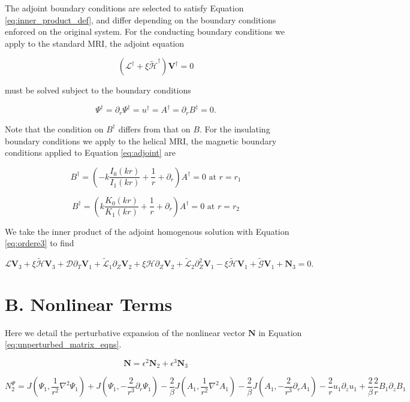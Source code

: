 \documentclass{emulateapj}
\newcommand{\beq}{\begin{equation}}
\newcommand{\eeq}{\end{equation}}
\begin{document}
The adjoint boundary conditions are selected to satisfy Equation \ref{eq:inner_product_def}, and differ depending on the boundary conditions enforced on the original system. For the conducting boundary conditions we apply to the standard MRI, the adjoint equation 

\beq\label{eq:adjoint}
(\mathcal{L}^\dagger + \xi \widetilde{\mathcal{H}}^\dagger)\mathbf{V}^\dagger = 0
\eeq

must be solved subject to the boundary conditions

\beq
\Psi^\dagger = \partial_r \Psi^\dagger = u^\dagger = A^\dagger = \partial_r B^\dagger = 0.
\eeq

Note that the condition on $B^\dagger$ differs from that on $B$. For the insulating boundary conditions we apply to the helical MRI, the magnetic boundary conditions applied to Equation \ref{eq:adjoint} are 

\beq
B^\dagger = (- k \frac{I_0 (k r)}{I_1 (k r)} + \frac{1}{r} + \partial_r ) A^\dagger = 0 \, \, \mathrm{at} \, \, r = r_1
\eeq

\beq
B^\dagger = (k \frac{K_0 (k r)}{K_1 (k r)} + \frac{1}{r} + \partial_r ) A^\dagger = 0 \, \, \mathrm{at} \, \, r = r_2
\eeq

We take the inner product of the adjoint homogenous solution with Equation \ref{eq:ordere3} to find 

\beq
\mathcal{L}\mathbf{V}_3 + \xi \widetilde{\mathcal{H}} \mathbf{V}_3 + \mathcal{D} \partial_T \mathbf{V}_1 + \widetilde{\mathcal{L}}_1 \partial_Z \mathbf{V}_2\nonumber 
+ \xi \mathcal{H}\partial_Z \mathbf{V}_2 + \widetilde{\mathcal{L}}_2 \partial_Z^2 \mathbf{V}_1 - \xi \widetilde{\mathcal{H}} \mathbf{V}_1 + \widetilde{\mathcal{G}} \mathbf{V}_1 + \mathbf{N}_3 = 0.
\eeq




\section{B. Nonlinear Terms}\label{app:nonlinear_terms}

Here we detail the perturbative expansion of the nonlinear vector $\mathbf{N}$ in Equation \ref{eq:unperturbed_matrix_eqns}. 

\beq
\mathbf{N} = \epsilon^2 \mathbf{N}_2 + \epsilon^3 \mathbf{N}_3
\eeq

\beq
N_2^{\Psi}  = J(\Psi_1, \frac{1}{r^2} \nabla^2 \Psi_1) + J(\Psi_1, -\frac{2}{r^3}\partial_r\Psi_1)
- \frac{2}{\beta} J (A_1, \frac{1}{r^2} \nabla^2 A_1) - \frac{2}{\beta} J(A_1, -\frac{2}{r^3} \partial_r A_1) - \frac{2}{r} u_1 \partial_z u_1 + \frac{2}{\beta} \frac{2}{r} B_1 \partial_z B_1
\eeq
\end{document}
